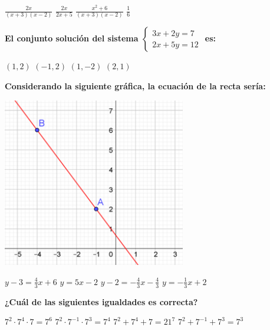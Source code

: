\documentclass[11pt, addpoints, answers]{exam}
\begin{document}
\begin{questions}
		\begin{choices} %
			\choice $\frac{2x}{(x+3)(x-2)}$
			\choice $\frac{2x}{2x+5}$
			\choice $\frac{x^2+6}{(x+3)(x-2)}$
			\choice $\frac{1}{6}$
		\end{choices}
		
		\question[1] \textbf{El conjunto solución del sistema $\begin{cases} 3x+2y=7 \\ 2x+5y=12 \end{cases}$ es:}
		\begin{choices}
			\choice $(1, 2)$
			\choice $(-1, 2)$
			\choice $(1, -2)$
			\choice $(2, 1)$
		\end{choices}
		
		\question[1] \textbf{Considerando la siguiente gráfica, la ecuación de la recta sería:}
		\begin{center}
			\includegraphics[width=0.6\textwidth]{image_248acc.png}
		
		\end{center}
		\begin{choices}
			\choice $y-3 = \frac{4}{3}x+6$
			\choice $y = 5x-2$
			\choice $y-2 = -\frac{4}{3}x - \frac{4}{3}$
			\choice $y = -\frac{1}{3}x+2$
		\end{choices}
		
			\vspace{1.5cm}
		
		
		\question[1] \textbf{¿Cuál de las siguientes igualdades es correcta?}
		\begin{choices}
			\choice $7^2 \cdot 7^4 \cdot 7 = 7^6$
			\choice $7^2 \cdot 7^{-1} \cdot 7^3 = 7^4$
			\choice $7^2 + 7^4 + 7 = 21^7$
			\choice $7^2 + 7^{-1} + 7^3 = 7^3$
		\end{choices}
		

\end{questions}
\end{document}
